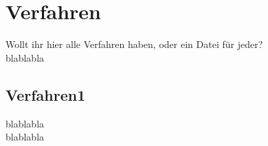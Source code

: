 
\chapter{Verfahren} %
\label{cha:Verfahren}

Wollt ihr hier alle Verfahren haben, oder ein Datei für jeder?\\

blablabla


\section{Verfahren1} %
\label{sec:Verfahren1}
blablabla\\

blablabla


